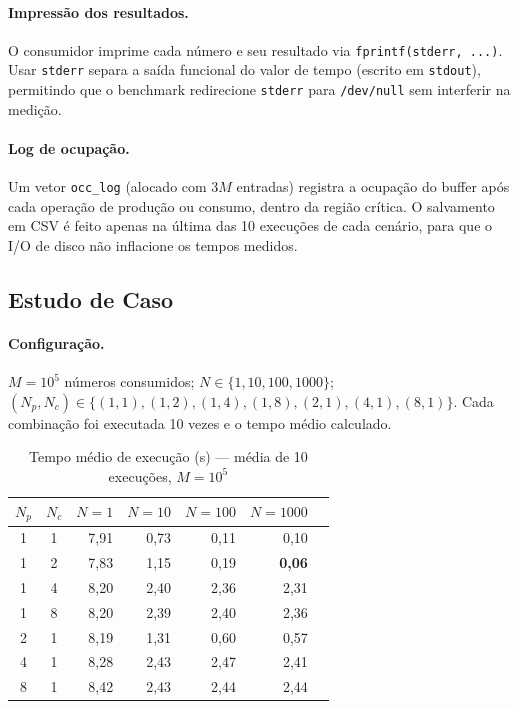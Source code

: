 \documentclass[12pt,a4paper]{article}
\begin{document}
\paragraph{Impressão dos resultados.}
O consumidor imprime cada número e seu resultado via \texttt{fprintf(stderr, ...)}.
Usar \texttt{stderr} separa a saída funcional do valor de tempo (escrito em
\texttt{stdout}), permitindo que o benchmark redirecione \texttt{stderr} para
\texttt{/dev/null} sem interferir na medição.

\paragraph{Log de ocupação.}
Um vetor \texttt{occ\_log} (alocado com $3M$ entradas) registra a ocupação
do buffer após cada operação de produção ou consumo, dentro da região crítica.
O salvamento em CSV é feito apenas na última das 10 execuções de cada cenário,
para que o I/O de disco não inflacione os tempos medidos.

\subsection{Estudo de Caso}

\paragraph{Configuração.}
$M = 10^5$ números consumidos; $N \in \{1, 10, 100, 1000\}$;
$(N_p, N_c) \in \{(1,1),(1,2),(1,4),(1,8),(2,1),(4,1),(8,1)\}$.
Cada combinação foi executada 10 vezes e o tempo médio calculado.

\begin{table}[H]
\centering
\caption{Tempo médio de execução (s) — média de 10 execuções, $M = 10^5$}
\label{tab:bench}
\small
\begin{tabular}{ccrrrrr}
\toprule
$N_p$ & $N_c$ & $N{=}1$ & $N{=}10$ & $N{=}100$ & $N{=}1000$ \\
\midrule
1 & 1 & 7,91 & 0,73 & 0,11 & 0,10 \\
1 & 2 & 7,83 & 1,15 & 0,19 & \textbf{0,06} \\
1 & 4 & 8,20 & 2,40 & 2,36 & 2,31 \\
1 & 8 & 8,20 & 2,39 & 2,40 & 2,36 \\
2 & 1 & 8,19 & 1,31 & 0,60 & 0,57 \\
4 & 1 & 8,28 & 2,43 & 2,47 & 2,41 \\
8 & 1 & 8,42 & 2,43 & 2,44 & 2,44 \\
\bottomrule
\end{tabular}
\end{table}
\end{document}

